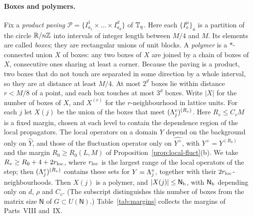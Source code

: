 \paragraph{Boxes and polymers.} Fix a \emph{product paving} $\mathcal P=\{I^1_{a_1}\times\dots\times I^d_{a_d}\}$ of $\mathbb T_\eta$. Here each $\{I^\mu_a\}_a$ is a partition of the circle $\mathbb R/n\mathbb Z$ into intervals of integer length between $M/4$ and $M$. Its elements are called \emph{boxes}; they are rectangular unions of unit blocks. A \emph{polymer} is a $*$-connected union $X$ of boxes: any two boxes of $X$ are joined by a chain of boxes of $X$, consecutive ones sharing at least a corner. Because the paving is a product, two boxes that do not touch are separated in some direction by a whole interval, so they are at distance at least $M/4$. At most $2^d$ boxes lie within distance $r<M/8$ of a point, and each box touches at most $3^d$ boxes. Write $|X|$ for the number of boxes of $X$, and $X^{(r)}$ for the $r$-neighbourhood in lattice units. For each $j$ let $X(j)$ be the union of the boxes that meet $(\Lambda^v_j)^{(R_v)}$. Here $R_v\le C_vM$ is a fixed margin, chosen at each level to contain the dependence region of the local propagators. The local operators on a domain $Y$ depend on the background only on $\hat Y$, and those of the fluctuation operator only on $\widehat{Y^+}$, with $Y^+=Y^{(R_0)}$ and the margin $R_0\ge R_0(L,M)$ of Proposition~\ref{prop:local-fluct}(b). We take $R_v\ge R_0+4+2r_{\rm loc}$, where $r_{\rm loc}$ is the largest range of the local operators of the step; then $(\Lambda^v_j)^{(R_v)}$ contains these sets for $Y=\Lambda^v_j$, together with their $2r_{\rm loc}$-neighbourhoods. Then $X(j)$ is a polymer, and $|X(j)|\le\mathsf N_{\rm b}$, with $\mathsf N_{\rm b}$ depending only on $d$, $\rho$ and $C_v$. (The subscript distinguishes this number of boxes from the matrix size $\mathsf N$ of $G\subset U(\mathsf N)$.) Table~\ref{tab:margins} collects the margins of Parts~VIII and~IX.

